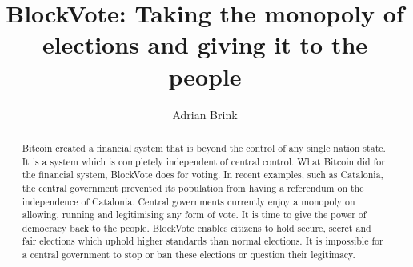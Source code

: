 \documentclass{article}
\title{BlockVote: Taking the monopoly of elections and giving it to the people}
\author{Adrian Brink}
\begin{document}
\maketitle

\begin{abstract}
  Bitcoin created a financial system that is beyond the control of any single nation state.
  It is a system which is completely independent of central control. What Bitcoin did for the
  financial system, BlockVote does for voting. In recent examples, such as Catalonia, the central
  government prevented its population from having a referendum on the independence of Catalonia.
  Central governments currently enjoy a monopoly on allowing, running and legitimising any form of
  vote. It is time to give the power of democracy back to the people. BlockVote enables citizens
  to hold secure, secret and fair elections which uphold higher standards than normal elections.
  It is impossible for a central government to stop or ban these elections or question their
  legitimacy. 
\end{abstract}


\end{document}
